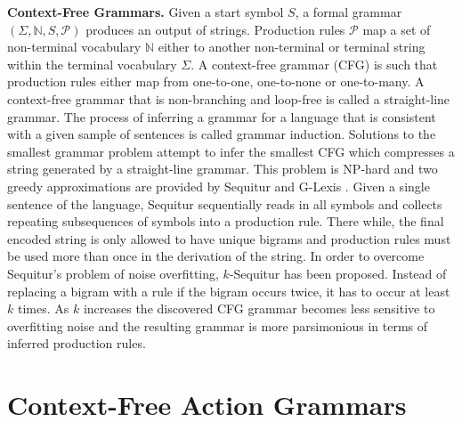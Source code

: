 \documentclass[10pt,letterpaper]{article}
\begin{document}
\textbf{Context-Free Grammars.} Given a start symbol $S$, a formal grammar $(\Sigma, \mathbb{N}, S, \mathcal{P})$ produces an output of strings. Production rules $\mathcal{P}$ map a set of non-terminal vocabulary $\mathbb{N}$ either to another non-terminal or terminal string within the terminal vocabulary $\Sigma$.
A context-free grammar (CFG) \cite{Chomsky_1959a} is such that production rules either map from one-to-one, one-to-none or one-to-many. A context-free grammar that is non-branching and loop-free is called a straight-line grammar. The process of inferring a grammar for a language that is consistent with a given sample of sentences is called grammar induction. Solutions to the smallest grammar problem \cite{Charikar_2005} attempt to infer the smallest CFG which compresses a string generated by a straight-line grammar. This problem is NP-hard \cite{Charikar_2005} and two greedy approximations are provided by Sequitur \cite{Manning_1997} and G-Lexis \cite{Siyari_2016b}.
Given a single sentence of the language, Sequitur sequentially reads in all symbols and collects repeating subsequences of symbols into a production rule. There while, the final encoded string is only allowed to have unique bigrams and production rules must be used more than once in the derivation of the string.
In order to overcome Sequitur's problem of noise overfitting, $k$-Sequitur \cite{Stout_2018} has been proposed. Instead of replacing a bigram with a rule if the bigram occurs twice, it has to occur at least $k$ times. As $k$ increases the discovered CFG grammar becomes less sensitive to overfitting noise and the resulting grammar is more parsimonious in terms of inferred production rules. 

\section{Context-Free Action Grammars}
\end{document}
